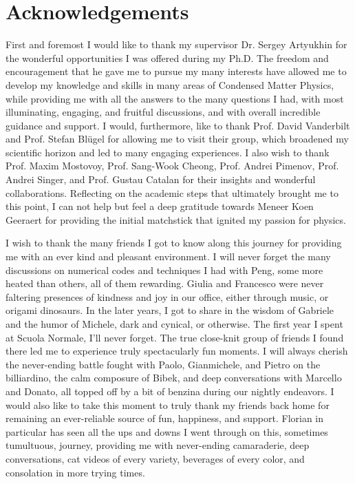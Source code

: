\documentclass[phd, titlesmallcaps,copyrightpage,foronline,oneside]{SNSthesis}
\begin{document}
\chapter*{Acknowledgements}
First and foremost I would like to thank my supervisor Dr. Sergey Artyukhin for the wonderful opportunities I was offered during my Ph.D. The freedom and encouragement that he gave me to pursue my many interests have allowed me to develop my knowledge and skills in many areas of Condensed Matter Physics, while providing me with all the answers to the many questions I had, with most illuminating, engaging, and fruitful discussions, and with overall incredible guidance and support.  I would, furthermore, like to thank Prof. David Vanderbilt and Prof. Stefan Bl\"ugel for allowing me to visit their group, which broadened my scientific horizon and led to many engaging experiences. I also wish to thank Prof. Maxim Mostovoy, Prof. Sang-Wook Cheong, Prof. Andrei Pimenov, Prof. Andrei Singer, and Prof. Gustau Catalan for their insights and wonderful collaborations. Reflecting on the academic steps that ultimately brought me to this point, I can not help but feel a deep gratitude towards Meneer Koen Geeraert for providing the initial matchstick that ignited my passion for physics.

I wish to thank the many friends I got to know along this journey for providing me with an ever kind and pleasant environment. I will never forget the many discussions on numerical codes and techniques I had with Peng, some more heated than others, all of them rewarding. Giulia and Francesco were never faltering presences of kindness and joy in our office, either through music, or origami dinosaurs. In the later years, I got to share in the wisdom of Gabriele and the humor of Michele, dark and cynical, or otherwise. The first year I spent at Scuola Normale, I'll never forget. The true close-knit group of friends I found there led me to experience truly spectacularly fun moments. I will always cherish the never-ending battle fought with Paolo, Gianmichele, and Pietro on the billiardino, the calm composure of Bibek, and deep conversations with Marcello and Donato, all topped off by a bit of benzina during our nightly endeavors.
I would also like to take this moment to truly thank my friends back home for remaining an ever-reliable source of fun, happiness, and support. Florian in particular has seen all the ups and downs I went through on this, sometimes tumultuous, journey, providing me with never-ending camaraderie, deep conversations, cat videos of every variety, beverages of every color, and consolation in more trying times.
\end{document}
